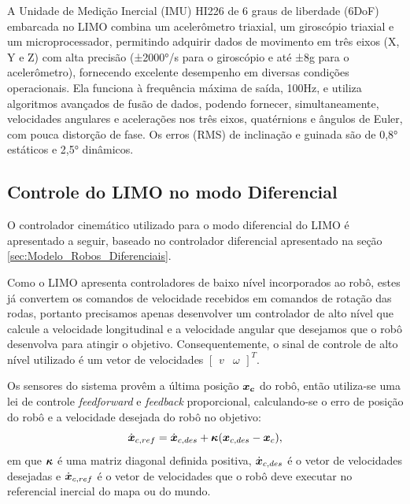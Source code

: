         A Unidade de Medição Inercial (IMU) HI226 de 6 graus de liberdade (6DoF) embarcada no LIMO combina um acelerômetro triaxial, um giroscópio triaxial e um microprocessador, permitindo adquirir dados de movimento em três eixos (X, Y e Z) com alta precisão (±2000°/s para o giroscópio e até ±8g para o acelerômetro), fornecendo excelente desempenho em diversas condições operacionais. Ela funciona à frequência máxima de saída, 100Hz, e utiliza algoritmos avançados de fusão de dados, podendo fornecer, simultaneamente, velocidades angulares e acelerações nos três eixos, quatérnions e ângulos de Euler, com pouca distorção de fase. Os erros (RMS) de inclinação e guinada são de 0,8° estáticos e 2,5° dinâmicos.


    \subsection{Controle do LIMO no modo Diferencial}
    \label{sec:Controle_Dif_LIMO}
    
        O controlador cinemático utilizado para o modo diferencial do LIMO é apresentado a seguir, baseado no controlador diferencial apresentado na seção \ref{sec:Modelo_Robos_Diferenciais}.
        
        Como o LIMO apresenta controladores de baixo nível incorporados ao robô, estes já convertem os comandos de velocidade recebidos em comandos de rotação das rodas, portanto precisamos apenas desenvolver um controlador de alto nível que calcule a velocidade longitudinal e a velocidade angular que desejamos que o robô desenvolva para atingir o objetivo. Consequentemente, o sinal de controle de alto nível utilizado é um vetor de velocidades $\begin{bmatrix}v & \omega \end{bmatrix}^{T}$.
        
        Os sensores do sistema provêm a última posição $\boldsymbol{x_c}$ do robô, então utiliza-se uma lei de controle \textit{feedforward} e \textit{feedback} proporcional, calculando-se o erro de posição do robô e a velocidade desejada do robô no objetivo:
        \begin{equation}
            \dot{\boldsymbol{x}}_{c,ref} = \dot{\boldsymbol{x}}_{c,des} + \boldsymbol{\kappa}(\boldsymbol{x}_{c,des} - \boldsymbol{x}_c),
            \label{eq:ff_fb_law_limo}
        \end{equation}
        em que $\boldsymbol{\kappa}$ é uma matriz diagonal definida positiva, $\dot{\boldsymbol{x}}_{c,des}$ é o vetor de velocidades desejadas e $\dot{\boldsymbol{x}}_{c,ref}$ é o vetor de velocidades que o robô deve executar no referencial inercial do mapa ou do mundo.
    
